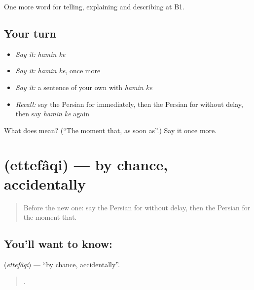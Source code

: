 \begin{grammarlens}[title={What you've built}]
One more word for telling, explaining and describing at B1.
\end{grammarlens}

\subsection*{Your turn}
\begin{itemize}
\raggedright
  \item \emph{Say it:} \emph{hamin ke}
  \item \emph{Say it:} \emph{hamin ke}, once more
  \item \emph{Say it:} a sentence of your own with \emph{hamin ke}
  \item \emph{Recall:} say the Persian for immediately, then the Persian for without delay, then say \emph{hamin ke} again
\end{itemize}

\begin{tcolorbox}[breakable,colback=teal!4,colframe=teal!35!black,title={Before you move on}]
What does   mean? (\textquotedblleft{}The moment that, as soon as\textquotedblright{}.) Say it once more.
\end{tcolorbox}
\section[\texorpdfstring{\fa{اتفاقی} (ettefâqi)}{اتفاقی (ettefâqi)}]{ (ettefâqi) — by chance, accidentally}

\label{lesson:FA-C300-ettefaqi}



\begin{quote}
Before the new one: say the Persian for without delay, then the Persian for the moment that.
\end{quote}

\subsection*{You'll want to know: }
\textbf{} (\emph{ettefâqi}) — \textquotedblleft{}by chance, accidentally\textquotedblright{}.

\begin{quote}
        .
\end{quote}

